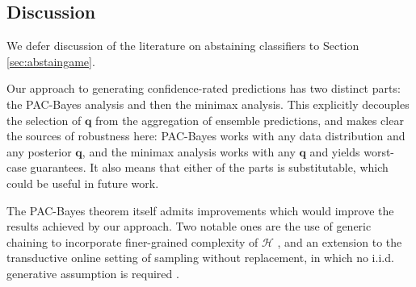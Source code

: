 \documentclass{article}[12pt]
\theoremstyle{named}
\newcommand{\vq}{\mathbf{q}}
\newcommand{\evp}[2]{\mathbb{E}_{#2} \left[#1\right]} %
\newcommand{\abs}[1]{\left| #1 \right|}
\newcommand{\emperr}[2]{\widehat{\mbox{err}}_{#2} \left(#1\right)}
\newcommand{\cH}{\mathcal{H}}
\newcommand{\lrp}[1]{\left(#1\right)}
\begin{document}
\subsection{Discussion}
We defer discussion of the literature on abstaining classifiers to Section \ref{sec:abstaingame}.

Our approach to generating confidence-rated predictions has two distinct parts: 
the PAC-Bayes analysis and then the minimax analysis. 
This explicitly decouples the selection of $\vq$ from the aggregation of ensemble predictions, 
and makes clear the sources of robustness here:
PAC-Bayes works with any data distribution and any posterior $\vq$, 
and the minimax analysis works with any $\vq$ and yields worst-case guarantees.
It also means that either of the parts is substitutable, which could be useful in future work.

The PAC-Bayes theorem itself admits improvements 
which would improve the results achieved by our approach. 
Two notable ones are the use of generic chaining to incorporate finer-grained complexity of $\cH$ \cite{AB07}, 
and an extension to the transductive online setting of sampling without replacement, 
in which no i.i.d. generative assumption is required \cite{BGLR14}. 



\end{document}
